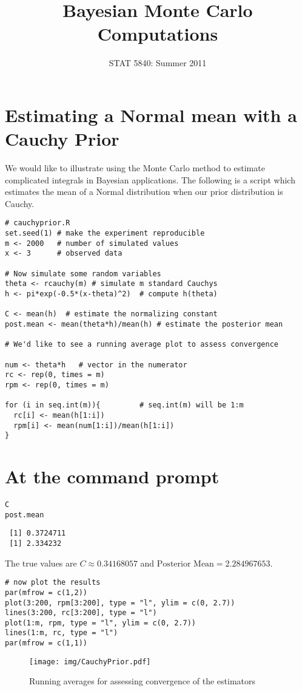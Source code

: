 \documentclass[11pt,english]{article}
\title{Bayesian Monte Carlo Computations}
\date{STAT 5840: Summer 2011}
\begin{document}
\maketitle

\thispagestyle{empty}

\section*{Estimating a Normal mean with a Cauchy Prior}
\label{sec-1}

We would like to illustrate using the Monte Carlo method to estimate complicated integrals in Bayesian applications.  The following is a script which estimates the mean of a Normal distribution when our prior distribution is Cauchy.


\begin{verbatim}
# cauchyprior.R
set.seed(1) # make the experiment reproducible
m <- 2000   # number of simulated values
x <- 3      # observed data

# Now simulate some random variables
theta <- rcauchy(m) # simulate m standard Cauchys
h <- pi*exp(-0.5*(x-theta)^2)  # compute h(theta)

C <- mean(h)  # estimate the normalizing constant
post.mean <- mean(theta*h)/mean(h) # estimate the posterior mean

# We'd like to see a running average plot to assess convergence

num <- theta*h   # vector in the numerator
rc <- rep(0, times = m)
rpm <- rep(0, times = m)

for (i in seq.int(m)){         # seq.int(m) will be 1:m
  rc[i] <- mean(h[1:i])
  rpm[i] <- mean(num[1:i])/mean(h[1:i])
}
\end{verbatim}
\section*{At the command prompt}
\label{sec-2}



\begin{verbatim}
C
post.mean
\end{verbatim}




\begin{verbatim}
 [1] 0.3724711
 [1] 2.334232
\end{verbatim}


The true values are \(C \approx 0.34168057 \) and \(\mbox{Posterior Mean} = 2.284967653\).


\begin{verbatim}
# now plot the results
par(mfrow = c(1,2))
plot(3:200, rpm[3:200], type = "l", ylim = c(0, 2.7))
lines(3:200, rc[3:200], type = "l")
plot(1:m, rpm, type = "l", ylim = c(0, 2.7))
lines(1:m, rc, type = "l")
par(mfrow = c(1,1))
\end{verbatim}




\begin{figure}[h!]
\centering
\texttt{[image: img/CauchyPrior.pdf]}
\caption{\label{fig:yplot}Running averages for assessing convergence of the estimators}
\end{figure}
\end{document}
